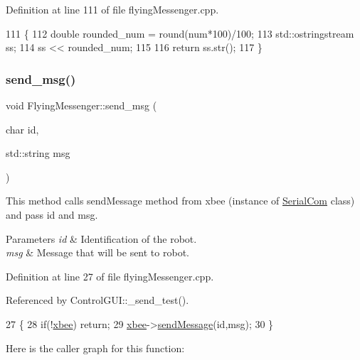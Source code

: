 Definition at line 111 of file flying\+Messenger.\+cpp.


\begin{DoxyCode}
111                                                  \{
112     \textcolor{keywordtype}{double} rounded\_num = round(num*100)/100;
113     std::ostringstream ss;
114     ss << rounded\_num;
115 
116     \textcolor{keywordflow}{return} ss.str();
117 \}
\end{DoxyCode}
\mbox{\label{class_flying_messenger_a6cb8e42cf99c0a11afbb441db28864a3}} 
\subsubsection{\texorpdfstring{send\+\_\+msg()}{send\_msg()}}
{\footnotesize\ttfamily void Flying\+Messenger\+::send\+\_\+msg (\begin{DoxyParamCaption}\item[{char}]{id,  }\item[{std\+::string}]{msg }\end{DoxyParamCaption})}



This method calls send\+Message method from xbee (instance of \hyperlink{class_serial_com}{Serial\+Com} class) and pass id and msg. 


\begin{DoxyParams}{Parameters}
{\em id} & Identification of the robot. \\
\hline
{\em msg} & Message that will be sent to robot. \\
\hline
\end{DoxyParams}


Definition at line 27 of file flying\+Messenger.\+cpp.



Referenced by Control\+G\+U\+I\+::\+\_\+send\+\_\+test().


\begin{DoxyCode}
27                                                      \{
28     \textcolor{keywordflow}{if}(!\hyperlink{class_flying_messenger_a419820a45ea2bc496c10bf36b7b49033}{xbee}) \textcolor{keywordflow}{return};
29     \hyperlink{class_flying_messenger_a419820a45ea2bc496c10bf36b7b49033}{xbee}->\hyperlink{class_serial_com_a0a371f0bf00f14bcf6ef23c752276144}{sendMessage}(\textcolor{keywordtype}{id},msg);
30 \}
\end{DoxyCode}
Here is the caller graph for this function\+:
\mbox{\label{class_flying_messenger_a7dd37ffc3394c87f190cbf6dc9405304}} 
